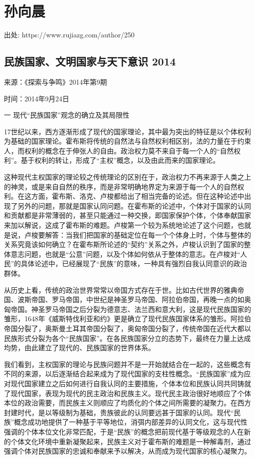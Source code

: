\documentclass[UTF8, 12pt, a4paper]{ctexrep}
\begin{document}
\newpage

\chapter{孙向晨}

出处: https://www.rujiazg.com/author/250

\newpage

\section{民族国家、文明国家与天下意识 2014}

来源：《探索与争鸣》2014年第9期

时间：2014年9月24日

一 现代“民族国家”观念的确立及其局限性

17世纪以来，西方逐渐形成了现代的国家理论，其中最为突出的特征是以个体权利为基础的国家理论。霍布斯将传统的自然法与自然权利相区别，法的力量在于约束人，而权利的概念在于伸张人的自由。政治权力莫不来自于每一个人的“自然权利”。基于权利的转让，形成了“主权”概念，以及由此而来的国家理论。

这种现代主权国家的理论较之传统理论的区别在于，政治权力不再来源于人类之上的神灵，或是来自自然的秩序，而是非常明确地界定为来源于每一个人的自然权利。在这方面，霍布斯、洛克、卢梭都给出了相当完备的论述。但在这种论述中出现了另外的问题，那就是国家认同问题。在霍布斯的论述中，个体对于国家的认同和贡献都是非常薄弱的，甚至只能通过一种交换，即国家保护个体，个体奉献国家来加以解说，这成了霍布斯的难题。卢梭第一个较为系统地论述了这个问题，也就是说，卢梭要解答：当我们把国家的基础定位在每一个个体身上时，个体与整体的关系究竟该如何确立？在霍布斯所论述的“契约”关系之外，卢梭认识到了国家的整体意志问题，也就是“公意”问题，以及个体如何依从于整体的意志。在卢梭对“人民”的具体论述中，已经展现了“民族”的意味，一种具有强烈自我认同意识的政治群体。

从历史上看，传统的政治世界常常以帝国方式存在于世。比如古代世界的雅典帝国、波斯帝国、罗马帝国，中世纪是神圣罗马帝国、阿拉伯帝国，再晚一点的如奥匈帝国。神圣罗马帝国之后分裂为德意志、法兰西和意大利，这是现代民族国家的雏形，1648年《威斯特伐利亚和约》更是确立了现代民族国家体系的雏形。阿拉伯帝国分裂了，奥斯曼土耳其帝国分裂了，奥匈帝国分裂了，传统帝国在近代大都以民族形式分裂为各个“民族国家”。在各民族国家分立的态势下，最终在力量上达成均势，由此建立了现代的、民族国家的世界体系。

我们看到，主权国家的理论与民族问题并不是一开始就结合在一起的，这些概念有不同的来源，以后逐渐结合起来成为了现代国家的支柱性概念。“民族国家”成为应对现代国家建立之后如何进行自我认同的主要措施，个体本位和民族认同共同铸就了现代国家，表现为现代的民主政治和民族主义。现代民主政治很好地顺应了个体本位的政治需要，而民族主义则顺应了均质化的个体之间所需要的凝聚力。在西方封建时代，是以等级制为基础，贵族彼此的认同要远甚于国家的认同。现代“民族”概念成功地提供了一种基于平等地位，消弭内部差异的认同文化，这与现代性强调的个体本位文化非常匹配，于是“民族”的概念把前现代基于等级观念的人在新的个体文化环境中重新凝聚起来，民族主义对于霍布斯的难题是一种解毒剂，通过强调个体对民族国家的忠诚和奉献来予以解决，从而成为现代国家的核心凝聚力。
\end{document}
